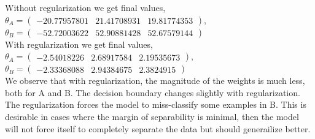\begin{answer}
\newpage
Without regularization we get final values, $\theta_A = \begin{pmatrix} -20.77957801 &  21.41708931 & 19.81774353\end{pmatrix}$, $\theta_B = \begin{pmatrix} -52.72003622 & 52.90881428 & 52.67579144\end{pmatrix}$\\
With regularization we get final values, $\theta_A = \begin{pmatrix} -2.54018226 & 2.68917584 & 2.19535673 \end{pmatrix}$,\\ $\theta_B = \begin{pmatrix} -2.33368088 & 2.94384675 & 2.3824915 \end{pmatrix}$
\\
We observe that with regularization, the magnitude of the weights is much less, both for A and B.
The decision boundary changes slightly with regularization.
The regularization forces the model to miss-classify some examples in B. This is desirable in cases where the margin of separability is minimal, then the model will not force itself to completely separate the data but should generailize better.
\end{answer}
